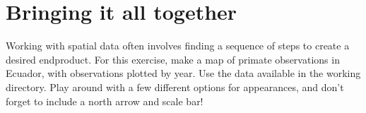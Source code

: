 \documentclass[
]{book}
\begin{document}
\hypertarget{bringing-it-all-together}{%
\chapter{Bringing it all together}\label{bringing-it-all-together}}

Working with spatial data often involves finding a sequence of steps to create a desired endproduct. For this exercise, make a map of primate observations in Ecuador, with observations plotted by year. Use the data available in the working directory. Play around with a few different options for appearances, and don't forget to include a north arrow and scale bar!

  
\end{document}
